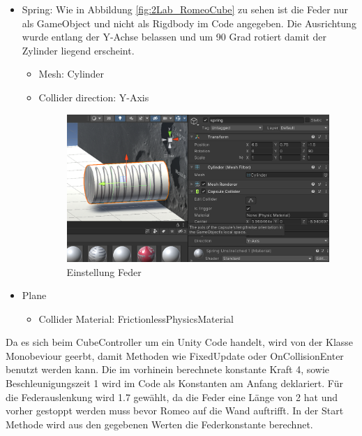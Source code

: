 \documentclass[../main.tex]{subfiles}
\begin{document}
\begin{itemize}
        \item Spring:
        \newline Wie in Abbildung \ref{fig:2Lab_RomeoCube} zu sehen ist die Feder nur als GameObject und nicht als Rigdbody
        im Code angegeben. Die Ausrichtung wurde entlang der Y-Achse belassen und um 90 Grad rotiert damit der Zylinder
        liegend erscheint.
        \begin{itemize}
            \item Mesh: Cylinder
            \item Collider direction: Y-Axis
            \begin{figure}[H]
                \begin{center}
                    \centerline{\includegraphics[width=100mm]{./images/2Lab_Spring.PNG}}
                    \caption{Einstellung Feder}
                    \label{fig:2Lab_Spring}
                \end{center}
            \end{figure}
        \end{itemize}

        \item Plane
        \begin{itemize}
            \item Collider Material: FrictionlessPhysicsMaterial
        \end{itemize}
    \end{itemize}\newline
    Da es sich beim CubeController um ein Unity Code handelt, wird von der Klasse Monobeviour geerbt, damit Methoden wie FixedUpdate oder OnCollisionEnter benutzt werden kann.
    Die im vorhinein berechnete konstante Kraft 4, sowie Beschleunigungszeit 1 wird im Code als Konstanten am Anfang deklariert.
    Für die Federauslenkung wird 1.7 gewählt, da die Feder eine Länge von 2 hat und vorher gestoppt werden muss bevor Romeo auf die Wand auftrifft.
    In der Start Methode wird aus den gegebenen Werten die Federkonstante berechnet.
\end{document}
